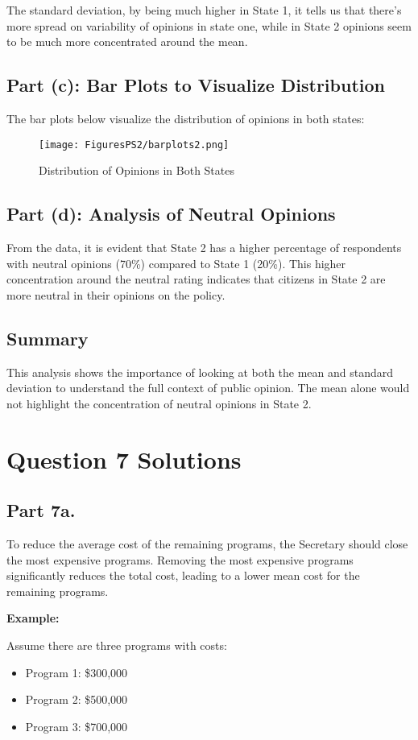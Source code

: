 \documentclass{article}
\begin{document}
The standard deviation, by being much higher in State 1, it tells us that there's more spread on variability of opinions in state one, while in State 2 opinions seem to be much more concentrated around the mean.

\subsection*{Part (c): Bar Plots to Visualize Distribution}
The bar plots below visualize the distribution of opinions in both states:
\begin{figure}[!ht]
\centering
\texttt{[image: FiguresPS2/barplots2.png]}
\caption{Distribution of Opinions in Both States}
\end{figure}

\subsection*{Part (d): Analysis of Neutral Opinions}
From the data, it is evident that State 2 has a higher percentage of respondents with neutral opinions (70\%) compared to State 1 (20\%). This higher concentration around the neutral rating indicates that citizens in State 2 are more neutral in their opinions on the policy.

\subsection*{Summary}
This analysis shows the importance of looking at both the mean and standard deviation to understand the full context of public opinion. The mean alone would not highlight the concentration of neutral opinions in State 2.

\section*{Question 7 Solutions}

\subsection*{Part 7a.}

To reduce the average cost of the remaining programs, the Secretary should close the most expensive programs. Removing the most expensive programs significantly reduces the total cost, leading to a lower mean cost for the remaining programs.

\textbf{Example:}

Assume there are three programs with costs:
\begin{itemize}
    \item Program 1: \$300,000
    \item Program 2: \$500,000
    \item Program 3: \$700,000
\end{itemize}
\end{document}
